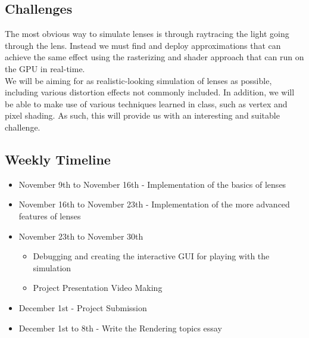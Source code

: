 \documentclass[12pt]{article}
\theoremstyle{remark}
\begin{document}
\subsection*{Challenges}
The most obvious way to simulate lenses is through raytracing the light going through the lens.
Instead we must find and deploy approximations that can achieve the same effect using the rasterizing and shader approach that can run on the GPU in real-time. \\

We will be aiming for as realistic-looking simulation of lenses as possible, including various distortion effects not commonly included. In addition, we will be able to make use of various techniques learned in class, such as vertex and pixel shading.
As such, this will provide us with an interesting and suitable challenge.

\subsection*{Weekly Timeline}
\begin{itemize}
  \item November 9th to November 16th - Implementation of the basics of lenses
  \item November 16th to November 23th - Implementation of the more advanced features of lenses
  \item November 23th to November 30th
    \begin{itemize}
      \item Debugging and creating the interactive GUI for playing with the simulation
      \item Project Presentation Video Making
    \end{itemize}
  \item December 1st - Project Submission
  \item December 1st to 8th - Write the Rendering topics essay
\end{itemize}
\end{document}
